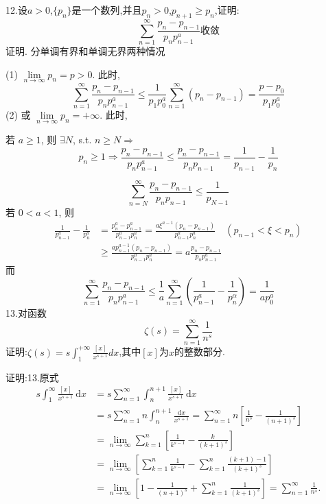\documentclass{ctexart}
\begin{document}
\begin{tcolorbox}[title = {综合性问题},colbacktitle=red!25!white,colback=white,arc = 2mm, outer arc = 2mm,fonttitle = \itshape, fontupper = \itshape, fontlower = \itshape]
		12.设$a > 0$,$\{p_{n}\}$是一个数列,并且$p_{n} > 0$,$p_{n+1} \ge p_{n}$,证明:
	$$\sum_{n=1}^{\infty}\frac{p_{n}-p_{n-1}}{p_{n}p_{n-1}^{a}}{\text{收敛}}$$
	{\color{red}证明.} 分单调有界和单调无界两种情况
	
	(1) $\lim\limits_{n \rightarrow \infty} p_{n}=p>0 .$ 此时,
	$$
	\sum_{n=1}^{\infty} \frac{p_{n}-p_{n-1}}{p_{n} p_{n-1}^{a}} \le \frac{1}{p_{1} p_{0}^{a}} \sum_{n=1}^{\infty}\left(p_{n}-p_{n-1}\right)=\frac{p-p_{0}}{p_{1} p_{0}^{a}}
	$$
	(2) 或 $\lim\limits_{n \rightarrow \infty} p_{n}=+\infty .$ 此时,
	
	若 $a \ge 1$, 则 $\exists N$, s.t. $n \ge N \Rightarrow$
	$$
	p_{n} \geq 1 \Rightarrow \frac{p_{n}-p_{n-1}}{p_{n} p_{n-1}^{a}} \le \frac{p_{n}-p_{n-1}}{p_{n} p_{n-1}}=\frac{1}{p_{n-1}}-\frac{1}{p_{n}}
	$$
	
	$$
	\sum_{n=N}^{\infty} \frac{p_{n}-p_{n-1}}{p_{n} p_{n-1}} \le \frac{1}{p_{N-1}}
	$$
	若 $0<a<1$, 则
	$$
	\begin{aligned}
		\frac{1}{p_{n-1}^{a}}-\frac{1}{p_{n}^{a}} &=\frac{p_{n}^{a}-p_{n-1}^{a}}{p_{n-1}^{a} p_{n}^{a}}=\frac{a \xi^{a-1}\left(p_{n}-p_{n-1}\right)}{p_{n-1}^{a} p_{n}^{a}} \quad\left(p_{n-1}<\xi<p_{n}\right) \\
		& \ge \frac{a p_{n-1}^{a-1}\left(p_{n}-p_{n-1}\right)}{p_{n-1}^{a} p_{n}^{a}}=a \frac{p_{n}-p_{n-1}}{p_{n} p_{n-1}^{a}}
	\end{aligned}
	$$
	而
	$$
	\sum_{n=1}^{\infty} \frac{p_{n}-p_{n-1}}{p_{n} p_{n-1}^{a}} \le \frac{1}{a} \sum_{n=1}^{\infty}\left(\frac{1}{p_{n-1}^{a}}-\frac{1}{p_{n}^{\alpha}}\right)=\frac{1}{a p_{0}^{a}}
	$$
	13.对函数$$\zeta(s)=\sum_{n=1}^{\infty }\frac{1}{n^{s}}  $$ 证明:$\displaystyle{\zeta(s)=s\int_{1}^{+\infty}\frac{[x]}{x^{s+1}}dx}$,其中$[x]$为$x$的整数部分.
\begin{tcolorbox}[colback=white,arc = 1mm, outer arc = 1mm,fonttitle = \itshape, fontupper = \itshape, fontlower = \itshape]
	
	{\color{red}证明:}13.原式 
	$$
	\begin{aligned}
		s \int_{1}^{\infty} \frac{[x]}{x^{s+1}} \mathrm{~d} x &=s \sum_{n=1}^{\infty} \int_{n}^{n+1} \frac{[x]}{x^{s+1}} \mathrm{~d} x \\
		&=s \sum_{n=1}^{\infty} n \int_{n}^{n+1} \frac{\mathrm{d} x}{x^{s+1}}=\sum_{n=1}^{\infty} n\left[\frac{1}{n^{s}}-\frac{1}{(n+1)^{s}}\right] \\
		&=\lim _{n \rightarrow \infty} \sum_{k=1}^{n}\left[\frac{1}{k^{s-1}}-\frac{k}{(k+1)^{s}}\right] \\
		&=\lim _{n \rightarrow \infty}\left[\sum_{k=1}^{n} \frac{1}{k^{s-1}}-\sum_{k=1}^{n} \frac{(k+1)-1}{(k+1)^{s}}\right] \\
		&=\lim _{n \rightarrow \infty}\left[1-\frac{1}{(n+1)^{s}}+\sum_{k=1}^{n} \frac{1}{(k+1)^{s}}\right]=\sum_{n=1}^{\infty} \frac{1}{n^{s}} .
	\end{aligned}
	$$	
\end{tcolorbox}

\end{tcolorbox}
\end{document}
